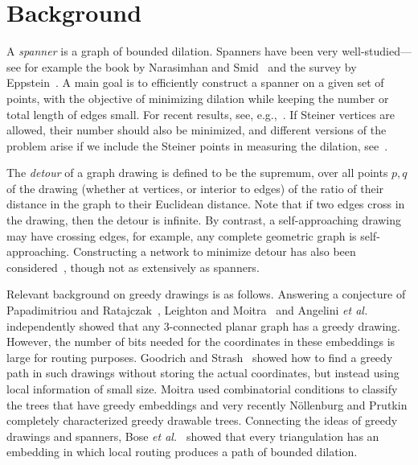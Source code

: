 \documentclass[11pt]{article}
\newcommand{\etal}{{\em et al.~}}
\newcommand{\changeS}[1]{{#1}}
\newcommand{\changeSH}[1]{{#1}}
\begin{document}
\section{Background}

A \emph{spanner} is a graph of bounded dilation.  Spanners have been very well-studied---see for example the book by Narasimhan and Smid~\cite{Spanners} and the survey by Eppstein~\cite{Eppstein:Spanners:2000}.
A main goal is to efficiently construct a spanner on a given set of points, with the objective of minimizing dilation while keeping
 the number or total length of edges small.  For recent results, see, e.g.,~\cite{Aronov:Spanners:2008,Giannopoulos:hard-spanners:2010}.
If Steiner vertices are allowed, their number should also be minimized, and different versions of the problem arise if we include the Steiner points in measuring the dilation, see~\cite{Ebbers:Dilation:2007}.

The \emph{detour} of a graph drawing is defined to be the supremum, over all points $p,q$ of the drawing (whether at vertices, or interior to edges) of the ratio of their distance in the graph to their Euclidean distance.  Note  that if two edges cross in the drawing, then the detour is infinite.  By contrast,  a self-approaching drawing may have crossing edges, for example, any complete geometric graph is self-approaching.
Constructing a network to minimize detour has also been considered~\cite{Ebbers:detour:2006,Dumitrescu:2009}, though not as extensively as spanners.

Relevant background on greedy drawings is as follows.
Answering a conjecture of Papadimitriou and Ratajczak~\cite{Papadimitriou:2005}, Leighton and Moitra~\cite{Leighton:2010}
\changeS{and Angelini \etal\cite{Angelini:2009} independently showed that any 3-connected planar graph has a greedy drawing. However, the number of bits needed for the coordinates in these embeddings is large for routing purposes. Goodrich and Strash~\cite{Goodrich:2008} showed how to find a greedy path in such drawings without storing the actual coordinates, but instead using local information of small size.}
Moitra \cite{Moitra:Thesis:2009} used combinatorial conditions to classify the trees that have greedy embeddings and \changeSH{very recently N{\"o}llenburg and Prutkin \cite{Nollenburg:2013} completely characterized greedy drawable trees.}
Connecting the ideas of greedy drawings and spanners,
Bose \etal\cite{Bose:theta6:2012} showed that every triangulation has an embedding in which local routing produces a path of bounded dilation.
\end{document}
